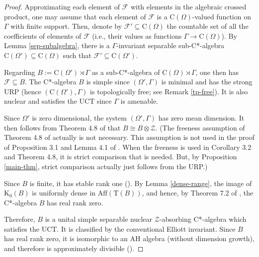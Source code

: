 \documentclass[12pt, oneside, psamsfonts]{amsart}
\theoremstyle{definition}
\theoremstyle{remark}
\numberwithin{equation}{section}
\newcommand{\Kzero}{\textrm{K}_0}
\begin{document}
\begin{proof}
Approximating each element of $\mathcal F$ with elements in the algebraic crossed  product, one may assume that each element of $\mathcal F$ is a $\mathrm{C}(\Omega)$-valued function on $\Gamma$ with finite support. Then, denote by  $\mathcal F' \subseteq \mathrm{C}(\Omega)$ the countable set of all the coefficients of elements of $\mathcal F$ (i.e., their values as functions $\Gamma \to \mathrm{C}(\Omega)$). By Lemma \ref{sep-subalgebra}, there is a $\Gamma$-invariant separable sub-C*-algebra $\mathrm{C}(\Omega') \subseteq \mathrm{C}(\Omega)$ such that
$\mathcal F' \subseteq \mathrm{C}(\Omega'). $

Regarding $B:=\mathrm{C}(\Omega') \rtimes \Gamma$ as a sub-C*-algebra of $\mathrm{C}(\Omega) \rtimes \Gamma$, one then has $\mathcal F \subseteq B$. The C*-algebra $B$ is simple since $(\Omega', \Gamma)$ is minimal and has the strong URP (hence $(\mathrm{C}(\Omega'), \Gamma)$ is topologically free; see Remark \ref{tp-free}). It is also nuclear and satisfies the UCT since $\Gamma$ is amenable. 

Since $\Omega'$ is zero dimensional, the system $(\Omega', \Gamma)$ has zero mean dimension. It then follows from Theorem 4.8 of  \cite{Niu-MD-Z-absorbing} that $B \cong B \otimes \mathcal Z$. (The freeness assumption of Theorem 4.8 of  \cite{Niu-MD-Z-absorbing} actually is not necessary. This assumption is not used in the proof of Proposition 3.1 and Lemma 4.1 of \cite{Niu-MD-Z-absorbing}. When the freeness is used in Corollary 3.2 and Theorem 4.8, it is strict comparison that is needed. But, by Proposition \ref{main-thm}, strict comparison actually just follows from the URP.)




Since $B$ is finite, it has stable rank one (\cite{Ror-Z-stable}). By Lemma \ref{dense-range}, the image of $\Kzero(B)$ is uniformly dense in $\mathrm{Aff}(\mathrm{T}(B))$, and hence, by Theorem 7.2 of \cite{Ror-Z-stable}, the C*-algebra $B$ has real rank zero.

Therefore, $B$ is a unital simple separable nuclear $\mathcal Z$-absorbing C*-algebra which satisfies the UCT. It is classified by the conventional Elliott invariant. Since $B$ has real rank zero, it is isomorphic to an AH algebra (without dimension growth), and therefore is approximately divisible (\cite{EGL-ADiv}). 
\end{proof}
\end{document}
